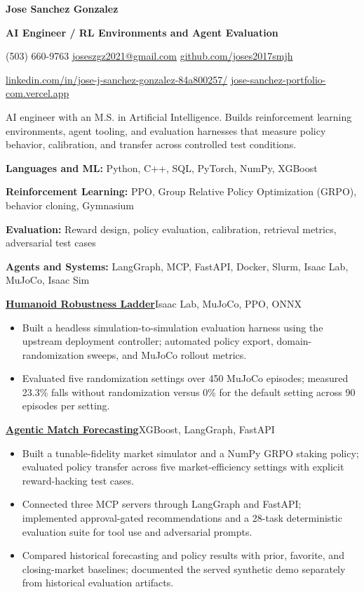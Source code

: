 \documentclass[letterpaper,10pt]{article}
\newcommand{\resumeSection}[1]{\par\vspace{7pt}{\large\bfseries #1}\par\vspace{3pt}}
\newcommand{\project}[3]{\par\vspace{3pt}\textbf{\href{#2}{#1}}\enspace\textbar\enspace #3\par}
\newcommand{\resumeItem}[1]{\item #1}
\begin{document}
{\fontsize{22}{25}\selectfont\bfseries Jose Sanchez Gonzalez}\par
\vspace{2pt}
\textbf{AI Engineer / RL Environments and Agent Evaluation}\par
\vspace{3pt}
{\fontsize{9}{10.5}\selectfont
(503) 660-9763\enspace\textbar\enspace
\href{mailto:joseszgz2021@gmail.com}{joseszgz2021@gmail.com}\enspace\textbar\enspace
\href{https://github.com/joses2017smjh}{github.com/joses2017smjh}\par
\href{https://linkedin.com/in/jose-j-sanchez-gonzalez-84a800257/}{linkedin.com/in/jose-j-sanchez-gonzalez-84a800257/}\enspace\textbar\enspace
\href{https://jose-sanchez-portfolio-com.vercel.app/}{jose-sanchez-portfolio-com.vercel.app}\par}
\resumeSection{Summary}
AI engineer with an M.S. in Artificial Intelligence. Builds reinforcement learning environments, agent tooling, and evaluation harnesses that measure policy behavior, calibration, and transfer across controlled test conditions.
\resumeSection{Technical Skills}
\textbf{Languages and ML:} Python, C++, SQL, PyTorch, NumPy, XGBoost\par
\textbf{Reinforcement Learning:} PPO, Group Relative Policy Optimization (GRPO), behavior cloning, Gymnasium\par
\textbf{Evaluation:} Reward design, policy evaluation, calibration, retrieval metrics, adversarial test cases\par
\textbf{Agents and Systems:} LangGraph, MCP, FastAPI, Docker, Slurm, Isaac Lab, MuJoCo, Isaac Sim\par
\resumeSection{Projects}
\project{Humanoid Robustness Ladder}{https://github.com/joses2017smjh/bhl-robustness-ladder}{Isaac Lab, MuJoCo, PPO, ONNX}
\begin{itemize}
\resumeItem{Built a headless simulation-to-simulation evaluation harness using the upstream deployment controller; automated policy export, domain-randomization sweeps, and MuJoCo rollout metrics.}
\resumeItem{Evaluated five randomization settings over 450 MuJoCo episodes; measured 23.3\% falls without randomization versus 0\% for the default setting across 90 episodes per setting.}
\end{itemize}
\project{Agentic Match Forecasting}{https://github.com/joses2017smjh/Agentic-Soccer-Match-Prediction-MCP}{XGBoost, LangGraph, FastAPI}
\begin{itemize}
\resumeItem{Built a tunable-fidelity market simulator and a NumPy GRPO staking policy; evaluated policy transfer across five market-efficiency settings with explicit reward-hacking test cases.}
\resumeItem{Connected three MCP servers through LangGraph and FastAPI; implemented approval-gated recommendations and a 28-task deterministic evaluation suite for tool use and adversarial prompts.}
\resumeItem{Compared historical forecasting and policy results with prior, favorite, and closing-market baselines; documented the served synthetic demo separately from historical evaluation artifacts.}
\end{itemize}
\end{document}
